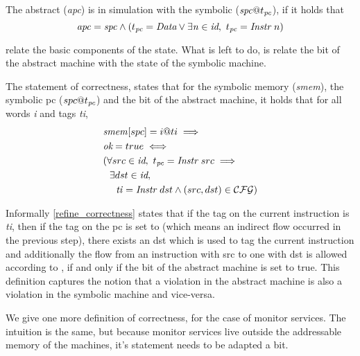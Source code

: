 \begin{definition}[PC simulation]
  \label{refine_pc}
  The abstract \pc (\textit{apc}) is in simulation with the symbolic \pc
  ($\mathit{spc}@t_{\textit{pc}}$), if it holds that
  $$\mathit{apc} = \mathit{spc} \land
    (t_{\textit{pc}} = \textit{Data} \lor \exists\mathit{n \in \textit{id}},~
    t_{\textit{pc}} = \textit{Instr}~n)$$
\end{definition}

 relate the basic
components of the state.  What is left to do, is relate the \ok bit of
the abstract machine with the state of the symbolic machine.

\begin{definition}[Correctness]
  \label{refine_correctness}
  The statement of correctness, states that for the symbolic memory
  (\textit{smem}), the symbolic pc ($spc@t_{\textit{pc}}$) and the \ok bit
  of the abstract machine, it holds that for all words \textit{i} and
  tags \textit{ti},
  \begin{align*}
     & \mathit{smem}[spc] = i@ti \implies \\
     & \textit{ok} = true  \iff \\
     & (\forall src \in \textit{id}, ~ t_{\textit{pc}} = \textit{Instr}~src \implies  \\
     & ~~\exists dst \in \textit{id}, \\
     & ~~~~ \mathit{ti} = \textit{Instr}~dst \land (src,dst) \in \mathcal{CFG})
    \end{align*}
\end{definition}

Informally \cref{refine_correctness} states that if the tag on the
current instruction is \textit{ti}, then if the tag on the pc is set
to  (which means an indirect flow occurred in the previous
step), there exists an \id dst which is used to tag the current
instruction and additionally the flow from an instruction with \id src
to one with \id dst is allowed according to \CFG, if and only if the
\ok bit of the abstract machine is set to true. This definition
captures the notion that a violation in the abstract machine is also a
violation in the symbolic machine and vice-versa.

We give one more definition of correctness, for the case of monitor
services.  The intuition is the same, but because monitor services
live outside the addressable memory of the machines, it's statement
needs to be adapted a bit.

